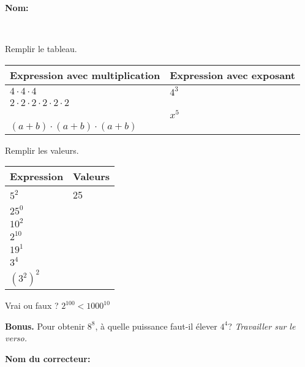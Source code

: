 \documentclass[12pt]{exam}
\begin{document}
\textbf{Nom:} \dotfill

\
\begin{questions}


\question[4] Remplir le tableau.

\begin{tabular}{|l|l|}
\hline
Expression avec multiplication & Expression avec exposant \\ \hline
$4 \cdot  4 \cdot 4 $                               &          $4^3$                 \\ \hline
 $2 \cdot 2 \cdot 2 \cdot 2 \cdot 2 \cdot 2$                           &                          \\ \hline
                               &     $x^5$                     \\ \hline
$(a + b) \cdot(a + b) \cdot(a + b)$                               &                          \\ \hline
\end{tabular}

\question[6] Remplir les valeurs.

\begin{tabular}{|l|l|}
\hline
Expression & Valeurs \\ \hline
$5^2$                               &       25                   \\ \hline
$25^0$                              &                          \\ \hline
$10^2$                              &                          \\ \hline
$2^{10}$                              &                          \\ \hline
$19^1$                              &                          \\ \hline
$3^4$                              &                          \\ \hline
$(3^2)^2$                              &                          \\ \hline
\end{tabular}

\question[2] Vrai ou faux ? $2^{100} < 1000^{10}$
\fillwithdottedlines{21mm}

\vfill

\question \textbf{Bonus.} Pour obtenir $8^8$, à quelle puissance faut-il élever $4^4$? \hfill \emph{Travailler sur le verso.}


\end{questions}

\begin{tcolorbox}

\textbf{Nom du correcteur:}

\begin{center}
\gradetable[h][questions]
\end{center}

\end{tcolorbox}
\end{document}
